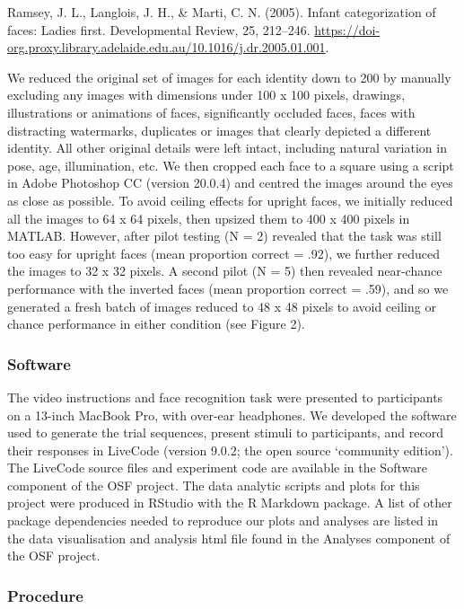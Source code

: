 \documentclass[
  english,
  man]{apa6}
\begin{document}
Ramsey, J. L., Langlois, J. H., \& Marti, C. N. (2005). Infant categorization of faces: Ladies first. Developmental Review, 25, 212--246. \url{https://doi-org.proxy.library.adelaide.edu.au/10.1016/j.dr.2005.01.001}.

We reduced the original set of images for each identity down to 200 by manually excluding any images with dimensions under 100 x 100 pixels, drawings, illustrations or animations of faces, significantly occluded faces, faces with distracting watermarks, duplicates or images that clearly depicted a different identity. All other original details were left intact, including natural variation in pose, age, illumination, etc. We then cropped each face to a square using a script in Adobe Photoshop CC (version 20.0.4) and centred the images around the eyes as close as possible. To avoid ceiling effects for upright faces, we initially reduced all the images to 64 x 64 pixels, then upsized them to 400 x 400 pixels in MATLAB. However, after pilot testing (N = 2) revealed that the task was still too easy for upright faces (mean proportion correct = .92), we further reduced the images to 32 x 32 pixels. A second pilot (N = 5) then revealed near-chance performance with the inverted faces (mean proportion correct = .59), and so we generated a fresh batch of images reduced to 48 x 48 pixels to avoid ceiling or chance performance in either condition (see Figure 2).

\hypertarget{software}{%
\subsubsection{Software}\label{software}}

The video instructions and face recognition task were presented to participants on a 13-inch MacBook Pro, with over-ear headphones. We developed the software used to generate the trial sequences, present stimuli to participants, and record their responses in LiveCode (version 9.0.2; the open source `community edition'). The LiveCode source files and experiment code are available in the Software component of the OSF project. The data analytic scripts and plots for this project were produced in RStudio with the R Markdown package. A list of other package dependencies needed to reproduce our plots and analyses are listed in the data visualisation and analysis html file found in the Analyses component of the OSF project.

\hypertarget{procedure}{%
\subsubsection{Procedure}\label{procedure}}
\end{document}
